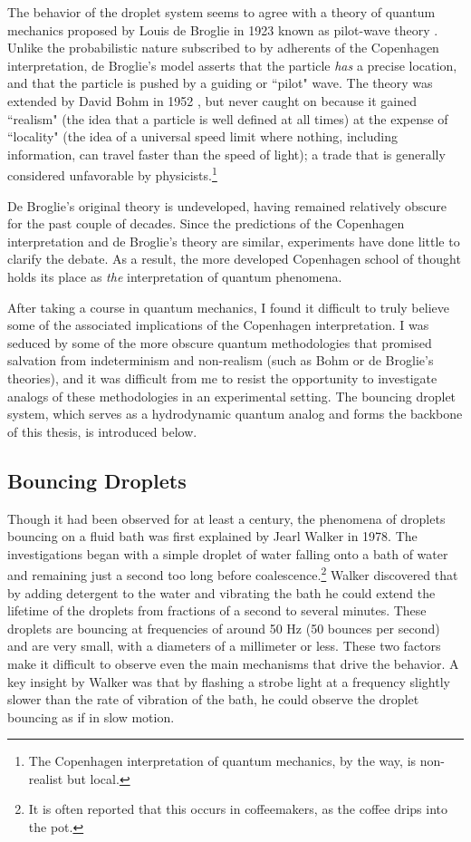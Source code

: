     The behavior of the droplet system seems to agree with a theory of quantum mechanics proposed by Louis de Broglie in 1923 known as pilot-wave theory . Unlike the probabilistic nature subscribed to by adherents of the Copenhagen interpretation, de Broglie's model asserts that the particle \textit{has} a precise location, and that the particle is pushed by a guiding or ``pilot" wave. The theory was extended by David Bohm in 1952 , but never caught on because it gained ``realism" (the idea that a particle is well defined at all times) at the expense of ``locality" (the idea of a universal speed limit where nothing, including information, can travel faster than the speed of light); a trade that is generally considered unfavorable by physicists.\footnote{The Copenhagen interpretation of quantum mechanics, by the way, is non-realist but local.} 
    
    De Broglie's original theory is undeveloped, having remained relatively obscure for the past couple of decades. Since the predictions of the Copenhagen interpretation and de Broglie's theory are similar, experiments have done little to clarify the debate. As a result, the more developed Copenhagen school of thought holds its place as \textit{the} interpretation of quantum phenomena. 
    
     After taking a course in quantum mechanics, I found it difficult to truly believe some of the associated implications of the Copenhagen interpretation. I was seduced by some of the more obscure quantum methodologies that promised salvation from indeterminism and non-realism (such as Bohm or de Broglie's theories), and it was difficult from me to resist the opportunity to investigate analogs of these methodologies in an experimental setting. The bouncing droplet system, which serves as a hydrodynamic quantum analog and forms the backbone of this thesis, is introduced below. 
    
	    \subsection*{Bouncing Droplets}
	    Though it had been observed for at least a century, the phenomena of droplets bouncing on a fluid bath was first explained by Jearl Walker in 1978. The investigations began with a simple droplet of water falling onto a bath of water and remaining just a second too long before coalescence.\footnote{It is often reported that this occurs in coffeemakers, as the coffee drips into the pot.} Walker discovered that by adding detergent to the water and vibrating the bath he could extend the lifetime of the droplets from fractions of a second to several minutes. These droplets are bouncing at frequencies of around 50 Hz (50 bounces per second) and are very small, with a diameters of a millimeter or less. These two factors make it difficult to observe even the main mechanisms that drive the behavior. A key insight by Walker was that by flashing a strobe light at a frequency slightly slower than the rate of vibration of the bath, he could observe the droplet bouncing as if in slow motion.
	    
